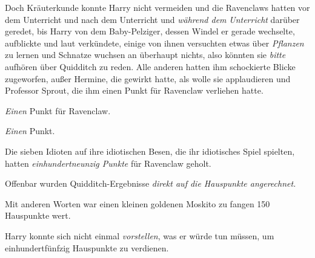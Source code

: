 Doch Kräuterkunde konnte Harry nicht vermeiden und die Ravenclaws hatten vor dem Unterricht und nach dem Unterricht und \emph{während dem} \emph{Unterricht} darüber geredet, bis Harry von dem Baby-Pelziger, dessen Windel er gerade wechselte, aufblickte und laut verkündete, einige von ihnen versuchten etwas über \emph{Pflanzen} zu lernen und Schnatze wuchsen an überhaupt nichts, also könnten sie \emph{bitte} aufhören über Quidditch zu reden. Alle anderen hatten ihm schockierte Blicke zugeworfen, außer Hermine, die gewirkt hatte, als wolle sie applaudieren und Professor Sprout, die ihm einen Punkt für Ravenclaw verliehen hatte.%

\emph{Einen} Punkt für Ravenclaw.

\emph{Einen} Punkt.

Die sieben Idioten auf ihre idiotischen Besen, die ihr idiotisches Spiel spielten, hatten \emph{einhundertneunzig Punkte} für Ravenclaw geholt.

Offenbar wurden Quidditch-Ergebnisse \emph{direkt auf die Hauspunkte angerechnet.}

Mit anderen Worten war einen kleinen goldenen Moskito zu fangen 150 Hauspunkte wert.

Harry konnte sich nicht einmal \emph{vorstellen}, was er würde tun müssen, um einhundertfünfzig Hauspunkte zu verdienen.

